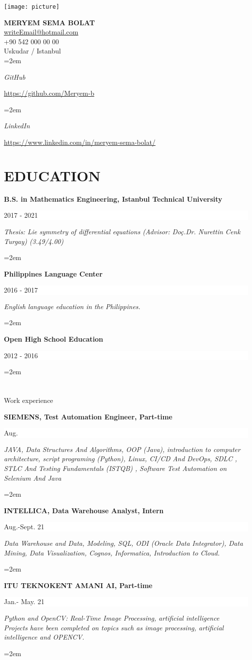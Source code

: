 \documentclass[paper=a4,fontsize=11pt]{scrartcl} %
\newlength{\spacebox}
\newcommand{\sepspace}{\vspace*{1em}}		%
\newcommand{\NewPart}[1]{\section*{\uppercase{#1}}}
\newcommand{\PersonalEntry}[2]{
		\noindent\hangindent=2em\hangafter=0 %
		\parbox{\spacebox}{        %
		\textit{#1}}		       %
		\hspace{1.5em} #2 \par}    %
\newcommand{\EducationEntry}[4]{
		\noindent \textbf{#1} \hfill      %
		\colorbox{White}{%
			\parbox{6em}{%
			\hfill\color{Black}#2}} \par  %
		\noindent \textit{#3} \par        %
		\noindent\hangindent=2em\hangafter=0 \small #4 %
		\normalsize \par}
\begin{document}
\begin{centering}
	\texttt{[image: picture]}
\sepspace



{\LARGE\bfseries\sffamily MERYEM SEMA BOLAT } \\[.1cm]
{\small  \href{mailto:writeEmai@hotmail.com}{writeEmail@hotmail.com}  \\[.1cm]
  +90 542 000 00 00   \\
Uskudar / Istanbul }\\[.1cm]
\PersonalEntry{GitHub}{\url{https://github.com/Meryem-b}}
\PersonalEntry{LinkedIn}{\url{https://www.linkedin.com/in/meryem-sema-bolat/}}

\end{centering}



\NewPart{Education}{}

\EducationEntry{B.S. in Mathematics Engineering, Istanbul Technical University }{2017 - 2021}
{Thesis: Lie symmetry of differential equations (Advisor: Doç.Dr. Nurettin Cenk Turgay)  (3.49/4.00)}

\singlespace

\EducationEntry{Philippines Language Center }{2016 - 2017}{English language education in the Philippines.}
\singlespace

\EducationEntry{Open High School Education}{2012 - 2016}
\singlespace



\NewPart{Work experience}{}



\EducationEntry{SIEMENS, Test Automation Engineer, Part-time}{Aug.}
{JAVA, Data Structures And Algorithms, OOP (Java), introduction to computer architecture, script programing (Python), Linux, CI/CD And DevOps, SDLC , STLC And Testing Fundamentals (ISTQB) , Software Test Automation on Selenium And Java }
\sepspace

\EducationEntry{INTELLICA, Data Warehouse Analyst, Intern}{Aug.-Sept. 21}
{Data Warehouse and  Data, Modeling, SQL, ODI (Oracle Data Integrator), Data Mining, Data Visualization, Cognos, Informatica, Introduction to Cloud. }
\sepspace


\EducationEntry{ITU TEKNOKENT AMANI AI, Part-time}{Jan.- May. 21 }
{Python and OpenCV: Real-Time Image Processing, artificial intelligence \\
Projects have been completed on topics such as image processing, artificial intelligence and OPENCV. }
\sepspace
\sepspace
\end{document}
